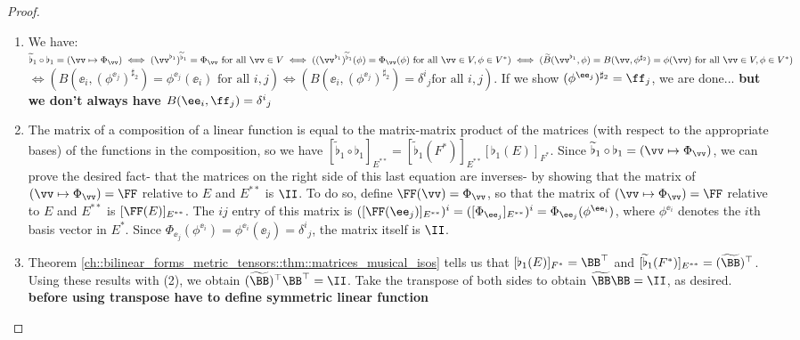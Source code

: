 \begin{proof}
    \hspace{0mm} \\
    \begin{enumerate}
        \item We have: $\widetilde{\flat}_1 \circ \flat_1 = (\vv \mapsto \Phi_\vv) \iff  (\vv^{\flat_1})^{\widetilde{\flat}_1} = \Phi_\vv \text{ for all $\vv \in V$} \iff
        ((\vv^{\flat_1})^{\widetilde{\flat}_1}(\phi) = \Phi_\vv(\phi) \text{ for all $\vv \in V, \phi \in V^*$}) \\ \iff
        (\widetilde{B}(\vv^{\flat_1}, \phi) = B(\vv, \phi^{\sharp_2}) = \phi(\vv) \text{ for all $\vv \in V, \phi \in V^*$})$ \\
        $\iff (B(\ee_i, (\phi^{\ee_j})^{\sharp_2}) = \phi^{\ee_j}(\ee_i) \text{ for all $i, j$}) \iff (B(\ee_i, (\phi^{\ee_j})^{\sharp_2}) = \delta^i{}_j \text{for all $i, j$})$. If we show $(\phi^{\ee_j})^{\sharp_2} = \ff_j$, we are done... \textbf{but we don't always have $B(\ee_i, \ff_j) = \delta^i{}_j$}
        
        \item The matrix of a composition of a linear function is equal to the matrix-matrix product of the matrices (with respect to the appropriate bases) of the functions in the composition, so we have $[\widetilde{\flat}_1 \circ \flat_1]_{E^{**}} = [\widetilde{\flat}_1(F^*)]_{E^{**}} [\flat_1(E)]_{F^*}$. Since $\widetilde{\flat}_1 \circ \flat_1 = (\vv \mapsto \Phi_\vv)$, we can prove the desired fact- that the matrices on the right side of this last equation are inverses- by showing that the matrix of $(\vv \mapsto \Phi_\vv) = \FF$ relative to $E$ and $E^{**}$ is $\II$. To do so, define $\FF(\vv) = \Phi_\vv$, so that the matrix of $(\vv \mapsto \Phi_\vv) = \FF$ relative to $E$ and $E^{**}$ is $[\FF(E)]_{E^{**}}$. The $ij$ entry of this matrix is $([\FF(\ee_j)]_{E^{**}})^i = ([\Phi_{\ee_j}]_{E^{**}})^i = \Phi_{\ee_j}(\phi^{\ee_i})$, where $\phi^{\ee_i}$ denotes the $i$th basis vector in $E^*$. Since $\Phi_{\ee_j}(\phi^{\ee_i}) = \phi^{\ee_i}(\ee_j) = \delta^i{}_j$, the matrix itself is $\II$.
        \item Theorem \ref{ch::bilinear_forms_metric_tensors::thm::matrices_musical_isos} tells us that $[\flat_1(E)]_{F^*} = \BB^\top$ and $[\widetilde{\flat}_1(F^*)]_{E^{**}} = (\widetilde{\BB})^\top$. Using these results with (2), we obtain $(\widetilde{\BB})^\top \BB^\top = \II$. Take the transpose of both sides to obtain $\widetilde{\BB} \BB = \II$, as desired. \textbf{before using transpose have to define symmetric linear function}
    \end{enumerate}
\end{proof}

